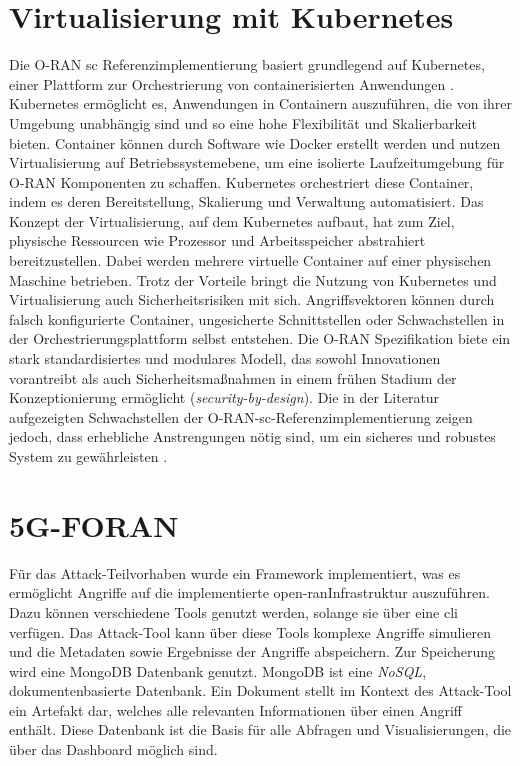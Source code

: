 \section{Virtualisierung mit Kubernetes}
Die O-RAN \gls{sc} Referenzimplementierung basiert grundlegend auf Kubernetes, einer Plattform zur Orchestrierung von containerisierten Anwendungen \autocite{ReleaseReleasesConfluence}. Kubernetes ermöglicht es, Anwendungen in Containern auszuführen, die von ihrer Umgebung unabhängig sind und so eine hohe Flexibilität und Skalierbarkeit bieten. Container können durch Software wie Docker erstellt werden und nutzen Virtualisierung auf Betriebssystemebene, um eine isolierte Laufzeitumgebung für O-RAN Komponenten zu schaffen. Kubernetes orchestriert diese Container, indem es deren Bereitstellung, Skalierung und Verwaltung automatisiert. Das Konzept der Virtualisierung, auf dem Kubernetes aufbaut, hat zum Ziel, physische Ressourcen wie Prozessor und Arbeitsspeicher abstrahiert bereitzustellen. Dabei werden mehrere virtuelle Container auf einer physischen Maschine betrieben. Trotz der Vorteile bringt die Nutzung von Kubernetes und Virtualisierung auch Sicherheitsrisiken mit sich. Angriffsvektoren können durch falsch konfigurierte Container, ungesicherte Schnittstellen oder Schwachstellen in der Orchestrierungsplattform selbst entstehen.
Die O-RAN Spezifikation biete ein stark standardisiertes und modulares Modell, das sowohl Innovationen vorantreibt als auch Sicherheitsmaßnahmen in einem frühen Stadium der Konzeptionierung ermöglicht (\textit{security-by-design}). Die in der Literatur aufgezeigten Schwachstellen der O-RAN-\gls{sc}-Referenzimplementierung zeigen jedoch, dass erhebliche Anstrengungen nötig sind, um ein sicheres und robustes System zu gewährleisten \autocite{klementSecuringOpenRAN2024}.

\section{5G-FORAN}
\label{sec:tech-foran}
Für das Attack-Teilvorhaben wurde ein Framework implementiert, was es ermöglicht Angriffe auf die implementierte \gls{open-ran}Infrastruktur auszuführen. Dazu können verschiedene Tools genutzt werden, solange sie über eine \gls{cli} verfügen. Das Attack-Tool kann über diese Tools komplexe Angriffe simulieren und die Metadaten sowie Ergebnisse der Angriffe abspeichern. Zur Speicherung wird eine MongoDB Datenbank genutzt. MongoDB ist eine \textit{NoSQL}, dokumentenbasierte Datenbank. Ein Dokument stellt im Kontext des Attack-Tool ein Artefakt dar, welches alle relevanten Informationen über einen Angriff enthält. Diese Datenbank ist die Basis für alle Abfragen und Visualisierungen, die über das Dashboard möglich sind.

